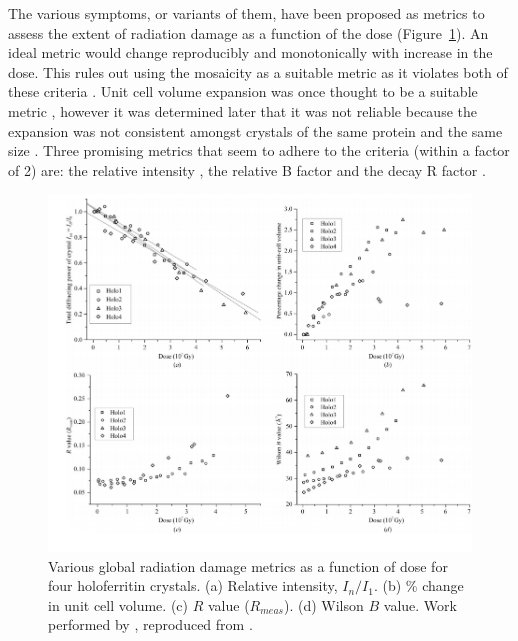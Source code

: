         The various symptoms, or variants of them, have been proposed as metrics to assess the extent of radiation damage as a function of the dose (Figure~\ref{fig:Radiation damage metrics}).
        An ideal metric would change reproducibly and monotonically with increase in the dose.
        This rules out using the mosaicity as a suitable metric as it violates both of these criteria \cite{garman2010}.
        Unit cell volume expansion was once thought to be a suitable metric \cite{ravelli2002}, however it was determined later that it was not reliable because the expansion was not consistent amongst crystals of the same protein and the same size \cite{murray2002}.
        Three promising metrics that seem to adhere to the criteria (within a factor of 2) are: the relative intensity \cite{owen2006}, the relative B factor \cite{kmetko2006} and the decay R factor \cite{diederichs2006}.

        \begin{figure}
            \centering
            \includegraphics[width=1.0\textwidth]{figures/introduction/raddammetrics.png}
            \caption{Various global radiation damage metrics as a function of dose for four holoferritin crystals.
            (a) Relative intensity, $I_n/I_1$.
            (b) \% change in unit cell volume.
            (c) $R$ value ($R_{meas}$).
            (d) Wilson $B$ value.
            Work performed by \cite{owen2006}, reproduced from \cite{garman2010}.}
            \label{fig:Radiation damage metrics}
        \end{figure}


